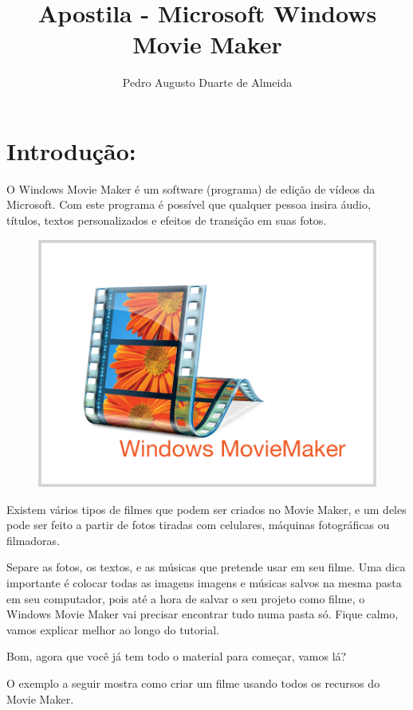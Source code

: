 \documentclass{article}
\title{Apostila - Microsoft Windows Movie Maker}
\author{Pedro Augusto Duarte de Almeida}
\date{}
\begin{document}
\maketitle

{\large

\section{Introdução:}
O Windows Movie Maker é um software (programa) de edição de vídeos da Microsoft.
Com este programa é possível que qualquer pessoa insira áudio, títulos, textos personalizados e efeitos de transição em suas fotos.

\begin{figure}[h!]
\centering
\includegraphics[scale=0.5]{movie-maker.png}
\end{figure} 

Existem vários tipos de filmes que podem ser criados no Movie Maker, e um deles pode ser feito a partir de fotos tiradas com celulares, máquinas fotográficas ou filmadoras.

Separe as fotos, os textos, e as músicas que pretende usar em seu filme. Uma dica importante é colocar todas as imagens imagens e músicas salvos na mesma pasta em seu computador, pois até a hora de salvar o seu projeto como filme, o Windows Movie Maker vai precisar encontrar tudo numa pasta só. Fique calmo, vamos explicar melhor ao longo do tutorial. \newline

Bom, agora que você já tem todo o material para começar, vamos lá? \newline

O exemplo a seguir mostra como criar um filme usando todos os recursos do
Movie Maker. \newline

}
\end{document}
